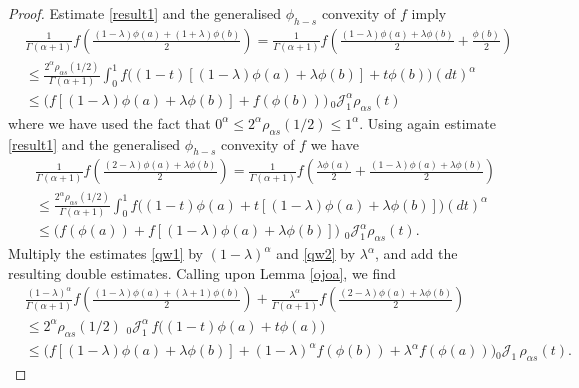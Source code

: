 \documentclass[10pt]{article}
\begin{document}
\begin{proof}
Estimate \eqref{result1} and the generalised $\phi_{h-s}$ convexity of $f$ imply
\begin{align}
&\frac{1}{\Gamma(\alpha+1)}f\left( \frac{(1-\lambda)\phi(a) + (1+\lambda)\phi(b)}{2} \right) = \frac{1}{\Gamma(\alpha+1)}f\left( \frac{(1-\lambda)\phi(a) + \lambda\phi(b)}{2} +\frac{\phi(b)}{2} \right)  \nonumber
\\& \leq \frac{2^\alpha\rho_{\alpha s}(1/2)}{\Gamma(\alpha +1)}\int_0^1 f\Big((1-t)[(1-\lambda)\phi(a) +\lambda\phi(b)] + t \phi(b)  \Big) (dt)^\alpha  \nonumber
\\& \leq  \Big( f[(1-\lambda)\phi(a) +\lambda \phi(b)] + f(\phi(b))  \Big) \, {}_0 \mathcal{J}_1^\alpha  \rho_{\alpha s} (t) \label{qw1}
\end{align}
where we have used the fact that $0^\alpha\leq 2^\alpha\rho_{\alpha s}(1/2)\leq 1^\alpha$. Using again estimate \eqref{result1} and the generalised $\phi_{h-s}$ convexity of $f$ we have
\begin{align}
& \frac{1}{\Gamma(\alpha+1)}f\left(\frac{(2-\lambda)\phi(a) +\lambda \phi(b)}{2}  \right) =  \frac{1}{\Gamma(\alpha+1)}f\left(\frac{\lambda\phi(a)}{2} +\frac{(1-\lambda)\phi(a)+\lambda \phi(b)}{2}  \right)  \nonumber
\\& \leq \frac{2^\alpha\rho_{\alpha s}(1/2)}{\Gamma(\alpha +1)}\int_0^1 f\Big((1-t)\phi(a) +t[(1-\lambda)\phi(a)+ \lambda \phi(b)  ]\Big) (dt)^\alpha  \nonumber
\\& \leq \Big(f(\phi(a))+f[(1-\lambda)\phi(a)+\lambda\phi(b)]\Big) \,\,{}_0\mathcal{J}_1^\alpha \rho_{\alpha s} (t).\label{qw2}
\end{align}
Multiply the estimates \eqref{qw1} by $(1-\lambda)^\alpha$ and \eqref{qw2} by $\lambda^\alpha$, and add the resulting double estimates.  Calling upon Lemma \ref{ojoa}, we find
\begin{align}
& \frac{(1-\lambda)^\alpha}{\Gamma(\alpha +1)} f\left( \frac{(1-\lambda)\phi(a) +(\lambda+1)\phi(b)}{2} \right) +\frac{\lambda^\alpha}{\Gamma(\alpha+1)} f\left( \frac{(2-\lambda)\phi(a)+\lambda\phi(b)}{2} \right)  \nonumber
\\& \leq 2^\alpha\rho_{\alpha s}(1/2)\,\, {}_0 \mathcal{J}_1^\alpha\, f\big((1-t)\phi(a) +t\phi(a)  \big)  \nonumber
\\&\leq \Big(f[(1-\lambda)\phi(a)+\lambda\phi(b)]  +(1-\lambda)^\alpha f(\phi(b)) +\lambda^\alpha f(\phi(a)) \Big) {}_0\mathcal{J}_1\, \rho_{\alpha s}(t).  \label{c1}
\end{align}




\end{proof}
\end{document}
